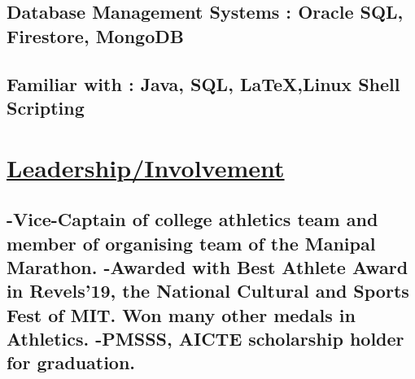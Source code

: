 \documentclass{article}
\begin{document}
\subsection{\textbf{Database Management Systems :}\textmd{ Oracle SQL, Firestore, MongoDB }}
\subsection{\textbf{Familiar with :}\textmd{ Java, SQL, {\LaTeX},Linux Shell Scripting }}










\section{\underline{Leadership/Involvement}}
\subsection{%
    \textmd{-Vice-Captain of college athletics team and member of organising team of the Manipal Marathon.}\newline
    \textmd{-Awarded with Best Athlete Award in Revels'19, the National Cultural and Sports Fest of MIT. Won many other medals in Athletics. }\newline
    \textmd{-PMSSS, AICTE scholarship holder for graduation.}}



\end{document}
